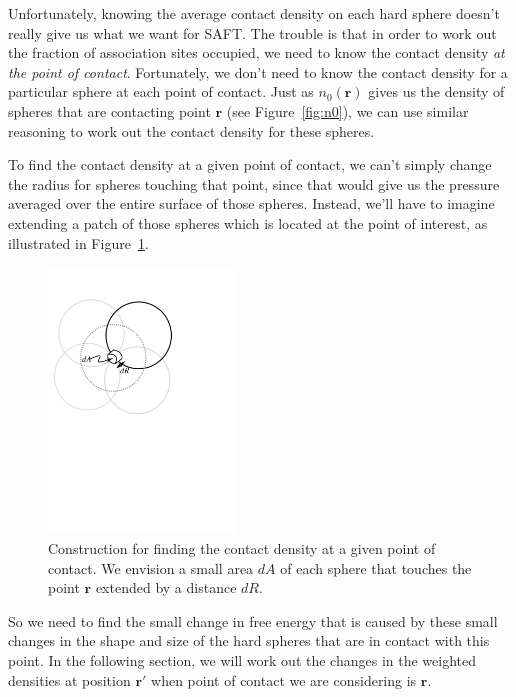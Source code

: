 \documentclass[letterpaper,twocolumn,amsmath,amssymb,prb]{revtex4-1}
\begin{document}
\begin{widetext}
Unfortunately, knowing the average contact density on each hard sphere
doesn't really give us what we want for SAFT.  The trouble is that in
order to work out the fraction of association sites occupied, we need
to know the contact density \emph{at the point of contact}.
Fortunately, we don't need to know the contact density for a
particular sphere at each point of contact.  Just as $n_0(\mathbf{r})$
gives us the density of spheres that are contacting point $\mathbf{r}$
(see Figure~\ref{fig:n0}), we can use similar reasoning to work out the
contact density for these spheres.

To find the contact density at a given point of contact, we can't
simply change the radius for spheres touching that point, since that
would give us the pressure averaged over the entire surface of those
spheres.  Instead, we'll have to imagine extending a patch of those
spheres which is located at the point of interest, as illustrated in
Figure~\ref{fig:contact}.

\begin{figure}
\includegraphics[width=5cm]{figs/contact}
\caption{Construction for finding the contact density at a given point
  of contact.  We envision a small area $dA$ of each sphere that touches
the point $\mathbf{r}$ extended by a distance $dR$.}
\label{fig:contact}
\end{figure}

So we need to find the small change in free energy that is caused by
these small changes in the shape and size of the hard spheres that are
in contact with this point.  In the following section, we will work
out the changes in the weighted densities at position $\mathbf{r}'$
when point of contact we are considering is $\mathbf{r}$.


\end{widetext}
\end{document}
